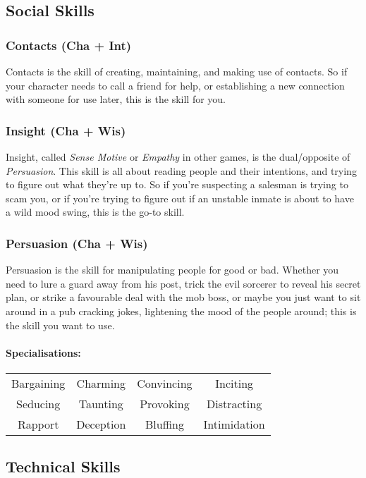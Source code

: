 \subsection{Social Skills}
\subsubsection{Contacts (Cha + Int)}
Contacts is the skill of creating, maintaining, and making use of contacts.
So if your character needs to call a friend for help, or establishing a new connection with someone for use later, this is the skill for you.

\subsubsection{Insight (Cha + Wis)}
Insight, called \textit{Sense Motive} or \textit{Empathy} in other games, is the dual/opposite of \textit{Persuasion}. 
This skill is all about reading people and their intentions, and trying to figure out what they're up to.
So if you're suspecting a salesman is trying to scam you, or if you're trying to figure out if an unstable inmate is about to have a wild mood swing, this is the go-to skill.

\subsubsection{Persuasion (Cha + Wis)}
Persuasion is the skill for manipulating people for good or bad.
Whether you need to lure a guard away from his post, trick the evil sorcerer to reveal his secret plan, or strike a favourable deal with the mob boss, or maybe you just want to sit around in a pub cracking jokes, lightening the mood of the people around; this is the skill you want to use.

\paragraph{Specialisations:}
\begin{center}
    \begin{tabular}{c|c|c|c}
        Bargaining & Charming & Convincing & Inciting \\
        Seducing & Taunting & Provoking & Distracting \\
        Rapport & Deception & Bluffing & Intimidation
    \end{tabular}
\end{center}

\subsection{Technical Skills}
